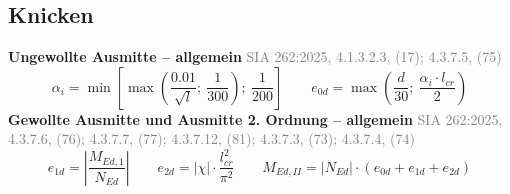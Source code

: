 \documentclass[11pt,a4paper]{article}
\newcommand{\normref}[1]{{\small\textcolor{gray}{#1}}}
\begin{document}
\subsection{Knicken}
\noindent\textbf{Ungewollte Ausmitte – allgemein} \hfill \normref{SIA 262:2025, 4.1.3.2.3, (17); 4.3.7.5, (75)}
\begin{equation*}
\alpha_i = \min\left[\max\left(\frac{0.01}{\sqrt{l}};\ \frac{1}{300}\right);\ \frac{1}{200}\right] \qquad e_{0d} = \max\left(\frac{d}{30};\ \frac{\alpha_i \cdot l_{cr}}{2}\right)
\end{equation*}
\noindent\textbf{Gewollte Ausmitte und Ausmitte 2. Ordnung – allgemein} \hfill \normref{SIA 262:2025, 4.3.7.6, (76); 4.3.7.7, (77); 4.3.7.12, (81); 4.3.7.3, (73); 4.3.7.4, (74)}
\begin{equation*}
e_{1d} = \left|\frac{M_{Ed,1}}{N_{Ed}}\right| \qquad e_{2d} = \left|\chi\right| \cdot \frac{l_{cr}^{2}}{\pi^{2}} \qquad M_{Ed,II} = \left|N_{Ed}\right| \cdot \left(e_{0d} + e_{1d} + e_{2d}\right)
\end{equation*}
\end{document}
